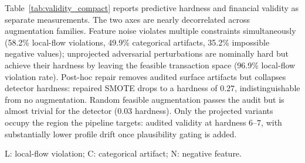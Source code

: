 \documentclass[sigconf,review,anonymous]{acmart}
\begin{document}
Table~\ref{tab:validity_compact} reports predictive hardness and financial
validity as separate measurements. The two axes are nearly decorrelated
across augmentation families. Feature noise violates multiple constraints
simultaneously (58.2\% local-flow violations, 49.9\% categorical artifacts,
35.2\% impossible negative values); unprojected adversarial perturbations are
nominally hard but achieve their hardness by leaving the feasible transaction
space (96.9\% local-flow violation rate). Post-hoc repair removes audited
surface artifacts but collapses detector hardness: repaired SMOTE drops to a
hardness of $0.27$, indistinguishable from no augmentation. Random feasible
augmentation passes the audit but is almost trivial for the detector
($0.03$ hardness). Only the projected variants occupy the region the pipeline
targets: audited validity at hardness $6$--$7$, with substantially lower
profile drift once plausibility gating is added.

\begin{table}[t]
\centering
\caption{Validity audit on generated examples. Invalidity reports nonzero
audited failure signals; ``valid'' means no audited surface artifact. Feature
noise and unprojected adversarial augmentation are stress tests, while repaired
and random-feasible rows are the meaningful controls.}
\label{tab:validity_compact}
\setlength{\tabcolsep}{3pt}
\renewcommand{\arraystretch}{1.08}
\vspace{2pt}
\footnotesize L: local-flow violation; C: categorical artifact; N: negative feature.
\end{table}
\end{document}
